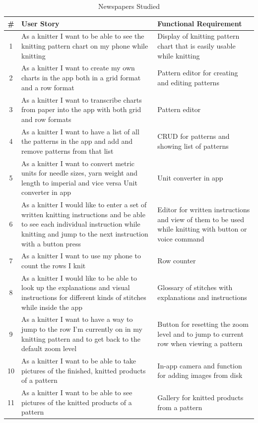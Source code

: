 \documentclass[a4paper,11pt]{kth-mag}
\begin{document}
\begin{landscape}
\begin{table}
\renewcommand{\arraystretch}{1.3}
\caption{Newspapers Studied}
\label{table_requirements}
\centering
\begin{tabular}{ c | p{10cm} | p{10cm} }
\# & User Story & Functional Requirement \\
\hline
1 &
As a knitter I want to be able
to see the knitting pattern chart
 on my phone while knitting &
 Display of knitting pattern chart
that is easily usable while knitting \\
2 & As a knitter I want to create my own charts in the app both in a grid format and a row format & Pattern editor for creating and editing patterns \\
3 & As a knitter I want to transcribe charts from paper into the app with both grid and row formats & Pattern editor \\
4 & As a knitter I want to have a list of all the patterns in the app and add and remove patterns from that list & CRUD for patterns and showing list of patterns \\
5 & As a knitter I want to convert metric units for needle sizes, yarn weight and length to imperial and vice versa Unit converter in app & Unit converter in app  \\
6 & As a knitter I would like to enter a set of written knitting instructions and be able to see each individual instruction while knitting and jump to the next instruction with a button press & Editor for written instructions and view of them to be used while knitting with button or voice command \\
7 & As a knitter I want to use my phone to count the rows I knit & Row counter \\
8 & As a knitter I would like to be able to look up the explanations and visual instructions for different kinds of stitches while inside the app & Glossary of stitches with explanations and instructions \\
9 & As a knitter I want to have a way to jump to the row I'm currently on in my knitting pattern and to get back to the default zoom level & Button for resetting the zoom level and to jump to current row when viewing a pattern \\
10 & As a knitter I want to be able to take pictures of the finished, knitted products of a pattern & In-app camera and function for adding images from disk \\
11 & As a knitter I want to be able to see pictures of the knitted products of a pattern & Gallery for knitted products from a pattern \\

\end{tabular}
\end{table}
\end{landscape}
\end{document}
